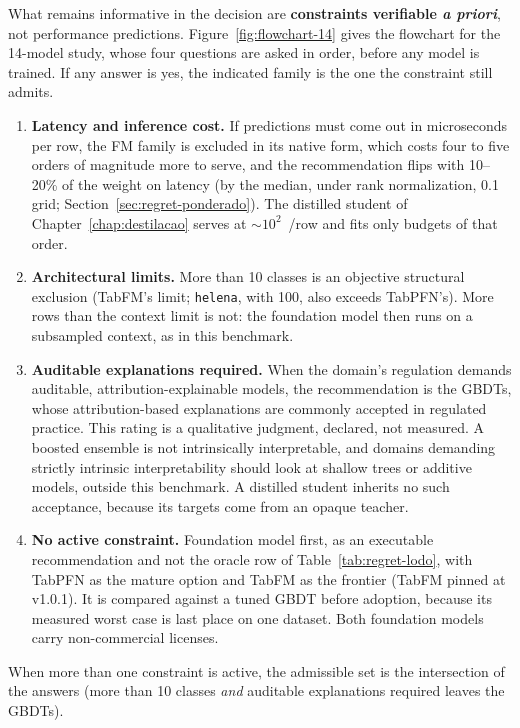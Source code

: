 What remains informative in the decision are \textbf{constraints
verifiable \emph{a priori}}, not performance predictions.
Figure~\ref{fig:flowchart-14} gives the flowchart for the 14-model study, whose four questions are asked in order, before any model is
trained. If any answer is yes, the indicated family is the one the constraint still admits.

\begin{enumerate}
  \item \textbf{Latency and inference cost.} If predictions must come
    out in microseconds per row, the FM family is excluded in its
    native form, which costs four to five orders of magnitude more to
    serve, and the recommendation flips with 10--20\% of the weight
    on latency (by the median, under rank normalization, 0.1 grid;
    Section~\ref{sec:regret-ponderado}). The distilled student of
    Chapter~\ref{chap:destilacao} serves at ${\sim}10^2$~\us/row
    and fits only budgets of that order.
  \item \textbf{Architectural limits.} More than 10 classes is an objective structural exclusion (TabFM's limit; \texttt{helena}, with 100, also exceeds TabPFN's). More rows than the context limit is not: the foundation
    model then runs on a subsampled context, as in this benchmark.
  \item \textbf{Auditable explanations required.} When the domain's
    regulation demands auditable, attribution-explainable models, the
    recommendation is the GBDTs, whose attribution-based explanations are commonly accepted in regulated practice. This rating is a qualitative judgment, declared, not measured. A boosted ensemble is not intrinsically interpretable, and domains demanding strictly intrinsic interpretability should look at shallow trees or additive models, outside this benchmark. A distilled student inherits no such acceptance, because its targets come from an opaque teacher.
  \item \textbf{No active constraint.} Foundation model first, as an executable recommendation and not the oracle row of Table~\ref{tab:regret-lodo}, with TabPFN \citep{hollmann2025} as the
    mature option and TabFM \citep{tabfm2026} as the frontier (TabFM
    pinned at v1.0.1). It is compared against a tuned GBDT before adoption, because its measured worst
    case is last place on one dataset. Both foundation models carry non-commercial licenses.
\end{enumerate}

When more than one constraint is active, the admissible set is the
intersection of the answers (more than 10 classes \emph{and} auditable explanations required leaves the GBDTs).

